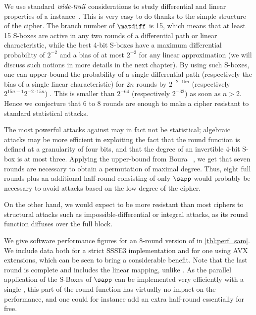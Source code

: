 We use standard $\emph{wide-trail}$ considerations to study differential and linear properties of a \sam instance~\cite{aes}.
This is very easy to do thanks to the simple structure of the cipher.
The branch number of $\matdiff$ is 15, which means that at least 15 S-boxes are active in any two rounds of
a differential path or linear characteristic, while the best 4-bit S-boxes have a maximum differential probability
of $2^{-2}$ and a bias of at most $2^{-2}$ for any linear approximation (we will discuss such notions in more details
in the next chapter). By using
such S-boxes, one can upper-bound the probability of a single differential path (respectively the bias of a single linear characteristic)
for $2 n$ rounds by $2^{-2\cdot 15 n}$ (respectively $2^{15n - 1}2^{-2\cdot 15 n}$) . This is smaller than $2^{-64}$ (respectively
$2^{-32}$)
as soon as $n > 2$. Hence we conjecture that 6 to 8 rounds are enough to make a cipher resistant
to standard statistical attacks.

The most powerful attacks against \sam may in fact not be statistical; algebraic attacks may be more
efficient in exploiting the fact that the round function is defined at a granularity of four bits,
and that the degree of an invertible 4-bit S-box is at most three. Applying the upper-bound
from Boura \etal~\cite[Thm. 2]{permdegree}, we get that seven rounds are necessary to
obtain a permutation of maximal degree. Thus, eight full rounds plus an additional half-round
consisting of only $\sapp$ would probably be necessary to avoid attacks based on the low degree
of the cipher.

On the other hand, we would expect \sam to be more resistant than most ciphers to structural attacks such as
impossible-differential or integral attacks, as its round function diffuses over the full block.

We give software performance figures for an 8-round version of \sam in \autoref{tbl:perf_sam}.
We include data both for a strict SSSE3 implementation and for one using AVX extensions, which
can be seen to bring a considerable benefit. Note that the last round is complete and includes the linear mapping, unlike \eg{}
\AES{}.
As the parallel application of the S-Boxes of $\sapp$ can be implemented very efficiently with
a single \pshufb{}, this part of the round function has virtually no impact on the performance, and one
could for instance add an extra half-round essentially for free.

